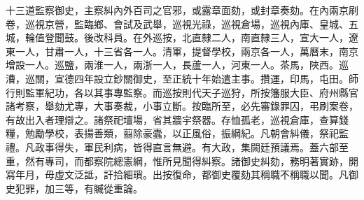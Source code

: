 十三道監察御史，主察糾內外百司之官邪，或露章面劾，或封章奏劾。在內兩京刷卷，巡視京營，監臨鄉、會試及武舉，巡視光祿，巡視倉場，巡視內庫、皇城、五城，輪值登聞鼓。後改科員。在外巡按，北直隸二人，南直隸三人，宣大一人，遼東一人，甘肅一人，十三省各一人。清軍，提督學校，兩京各一人，萬曆末，南京增設一人。巡鹽，兩淮一人，兩浙一人，長蘆一人，河東一人。茶馬，陜西。巡漕，巡關，宣德四年設立鈔關御史，至正統十年始遣主事。攢運，印馬，屯田。師行則監軍紀功，各以其事專監察。而巡按則代天子巡狩，所按籓服大臣、府州縣官諸考察，舉劾尤專，大事奏裁，小事立斷。按臨所至，必先審錄罪囚，弔刷案卷，有故出入者理辯之。諸祭祀壇場，省其牆宇祭器。存恤孤老，巡視倉庫，查算錢糧，勉勵學校，表揚善類，翦除豪蠹，以正風俗，振綱紀。凡朝會糾儀，祭祀監禮。凡政事得失，軍民利病，皆得直言無避。有大政，集闕廷預議焉。蓋六部至重，然有專司，而都察院總憲綱，惟所見聞得糾察。諸御史糾劾，務明著實跡，開寫年月，毋虛文泛詆，訐拾細瑣。出按復命，都御史覆劾其稱職不稱職以聞。凡御史犯罪，加三等，有贓從重論。

